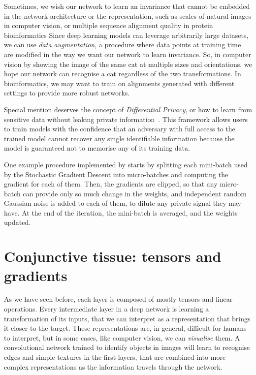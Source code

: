 Sometimes, we wish our network to learn an invariance that cannot be embedded in the network architecture or the representation, 
such as scales of natural images in computer vision, or multiple sequence alignment quality in protein bioinformatics
Since deep learning models can leverage arbitrarily large datasets, we can use \emph{data augmentation}, a procedure where data points at training time are modified in the way we want our network to learn invariance.
So, in computer vision by showing the image of the same cat at multiple sizes and orientations, we hope our network can recognise a cat regardless of the two transformations.
In bioinformatics, we may want to train on alignments generated with different settings to provide more robust networks.

Special mention deserves the concept of \emph{Differential Privacy}, or how to learn from sensitive data without leaking private information~\citep{differential_privacy}. 
This framework allows users to train models with the confidence that an adversary with full access to the trained model cannot recover any single identifiable information because the model is guaranteed not to memorise any of its training data.

One example procedure implemented by \citet{tf_privacy} starts by splitting each mini-batch used by the Stochastic Gradient Descent into micro-batches and computing the gradient for each of them.
Then, the gradients are clipped, so that any micro-batch can provide only so much change in the weights, and independent random Gaussian noise is added to each of them, to dilute any private signal they may have.
At the end of the iteration, the mini-batch is averaged, and the weights updated.


\section[Tensors and gradients]{Conjunctive tissue: tensors and gradients}\label{sec:tensors}
As we have seen before, each layer is composed of mostly tensors and linear operations.
Every intermediate layer in a deep network is learning a transformation of its inputs, that we can interpret as a representation that brings it closer to the target.
These representations are, in general, difficult for humans to interpret, but in some cases, like computer vision, we can \emph{visualise} them.
A convolutional network trained to identify objects in images will learn to recognise edges and simple textures in the first layers, that are combined into more complex representations as the information travels through the network.

